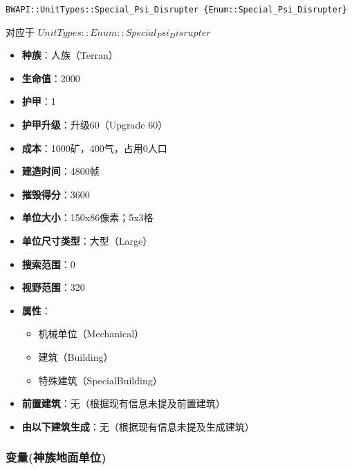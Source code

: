 \begin{tcolorbox}[colback=white, colframe=black!60!white, title=Special\_Psi\_Disrupter(), arc=0mm]
    \begin{verbatim}
BWAPI::UnitTypes::Special_Psi_Disrupter {Enum::Special_Psi_Disrupter}
    \end{verbatim}
    对应于  $ UnitTypes::Enum::Special_Psi_Disrupter $ 
    \begin{itemize}
        \item \textbf{种族}：人族（Terran）
        \item \textbf{生命值}：2000
        \item \textbf{护甲}：1
        \item \textbf{护甲升级}：升级60（Upgrade 60）
        \item \textbf{成本}：1000矿，400气，占用0人口
        \item \textbf{建造时间}：4800帧
        \item \textbf{摧毁得分}：3600
        \item \textbf{单位大小}：150x86像素；5x3格
        \item \textbf{单位尺寸类型}：大型（Large）
        \item \textbf{搜索范围}：0
        \item \textbf{视野范围}：320
        \item \textbf{属性}：
            \begin{itemize}
                \item 机械单位（Mechanical）
                \item 建筑（Building）
                \item 特殊建筑（SpecialBuilding）
            \end{itemize}
        \item \textbf{前置建筑}：无（根据现有信息未提及前置建筑）
        \item \textbf{由以下建筑生成}：无（根据现有信息未提及生成建筑）
    \end{itemize} 
\end{tcolorbox}

\subsubsection{变量(神族地面单位)}

